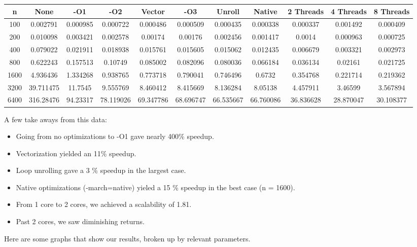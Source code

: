 \documentclass[12]{article}
\begin{document}
\hskip-2.2cm
\begin{tabular}{|c|c|c|c|c|c|c|c|c|c|c|}
\hline
n & None & -O1 & -O2 & Vector & -O3 & Unroll & Native & 2 Threads & 4 Threads & 8 Threads\\
\hline
100	& 0.002791 & 0.000985 & 0.000722 & 0.000486 & 0.000509 & 0.000435 & 0.000338 & 	0.000337 & 0.001492	& 0.000409 \\
200	& 0.010098 & 0.003421 &	0.002578 &	0.00174 & 0.00176 & 0.002456 & 0.001417 & 	0.0014 & 0.000963 &	0.000725 \\
400	& 0.079022 & 0.021911 & 0.018938 & 0.015761 & 0.015605 & 0.015062 & 0.012435 & 0.006679 & 0.003321 & 0.002973 \\
800	& 0.622243 & 0.157513 & 0.10749 & 0.085002 & 0.082096 & 0.080036 & 0.066184 & 0.036134 & 0.02161 & 0.021725 \\
1600 & 4.936436 & 1.334268 & 0.938765 & 0.773718 & 0.790041 & 0.746496 & 0.6732 &	0.354768 & 0.221714 & 0.219362 \\
3200&39.711475&11.7545&9.555769&8.460412&	8.415669&8.136284&8.05138&4.457911&3.46599&	3.567894 \\

6400&316.28476&94.23317&78.119026&	69.347786&68.696747&66.535667&66.760086&	36.836628&28.870047&30.108377 \\
\hline
\end{tabular}

A few take aways from this data:

\begin{itemize}
\setlength\itemsep{0.25em}
\item Going from no optimizations to -O1 gave nearly 400\% speedup.  
\item Vectorization yielded an 11\% speedup.
\item Loop unrolling gave a 3 \% speedup in the largest case.
\item Native optimizations (-march=native) yieled a 15 \% speedup in the best case (n = 1600).  
\item From 1 core to 2 cores, we achieved a scalability of 1.81. 
\item Past 2 cores, we saw diminishing returns.  
\end{itemize}

Here are some graphs that show our results, broken up by relevant parameters.  
\end{document}
